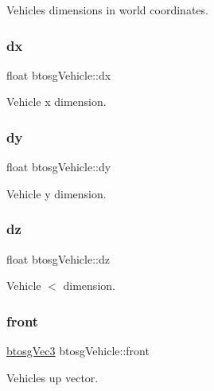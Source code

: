 Vehicle\textquotesingle{}s dimensions in world coordinates. 

\mbox{\label{classbtosgVehicle_aed23010bba3c34158abd4548328b3819}} 
\subsubsection{\texorpdfstring{dx}{dx}}
{\footnotesize\ttfamily float btosg\+Vehicle\+::dx}



Vehicle x dimension. 

\mbox{\label{classbtosgVehicle_ae124e1cd8c424080d7be7c47edb07eb1}} 
\subsubsection{\texorpdfstring{dy}{dy}}
{\footnotesize\ttfamily float btosg\+Vehicle\+::dy}



Vehicle y dimension. 

\mbox{\label{classbtosgVehicle_a39857392dc4882886964c1beefa46268}} 
\subsubsection{\texorpdfstring{dz}{dz}}
{\footnotesize\ttfamily float btosg\+Vehicle\+::dz}



Vehicle $<$ dimension. 

\mbox{\label{classbtosgVehicle_a33d6c0dc296ac54ec4a37e34332fa446}} 
\subsubsection{\texorpdfstring{front}{front}}
{\footnotesize\ttfamily \mbox{\hyperlink{classbtosgVec3}{btosg\+Vec3}} btosg\+Vehicle\+::front}



Vehicle\textquotesingle{}s up vector. 

